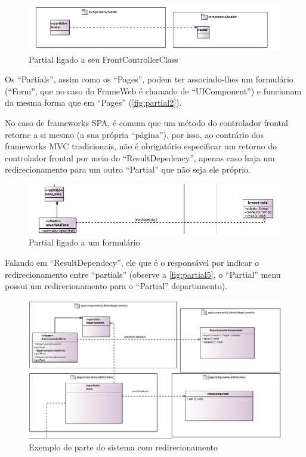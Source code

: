 \documentclass[
article,			%
11pt,				%
oneside,			%
a4paper,			%
english,			%
brazil,				%
sumario=tradicional
]{abntex2}
\begin{document}
\begin{figure}
	\centering
	\includegraphics[width=0.7\linewidth]{figuras/Partial4}
	\caption{Partial ligado a seu FrontControllerClass}
	\label{fig:partial4}
\end{figure}

Os ``Partials'', assim como os ``Pages'', podem ter associado-lhes um formulário (``Form'', que no caso do FrameWeb é chamado de ``UIComponent'') e funcionam da mesma forma que em ``Pages'' (\autoref{fig:partial2}).

No caso de frameworks SPA, é comum que um método do controlador frontal retorne a si mesmo (a sua própria ``página''), por isso, ao contrário dos frameworks MVC tradicionais, não é obrigatório especificar um retorno do controlador frontal por meio do ``ResultDepedency'', apenas caso haja um redirecionamento para um outro ``Partial'' que não seja ele próprio.

\begin{figure}
	\centering
	\includegraphics[width=0.7\linewidth]{figuras/Partial2}
	\caption{Partial ligado a um formulário}
	\label{fig:partial2}
\end{figure}

Falando em ``ResultDependecy'', ele que é o responsável por indicar o redirecionamento entre ``partials'' (observe a \autoref{fig:partial5}, o ``Partial'' menu possui um redirecionamento para o ``Partial'' departamento).

\begin{figure}
	\centering
	\includegraphics[width=0.7\linewidth]{figuras/Partial5}
	\caption{Exemplo de parte do sistema com redirecionamento}
	\label{fig:partial5}
\end{figure}
\end{document}
